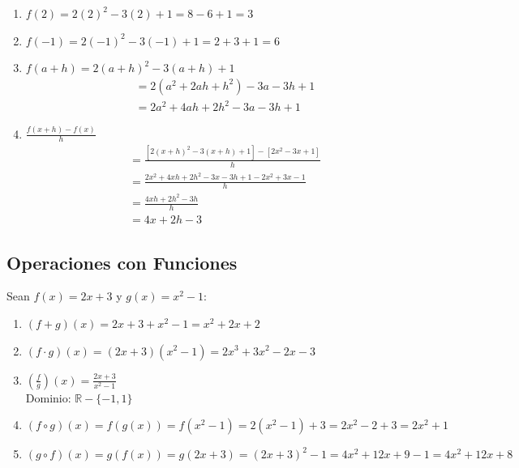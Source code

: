 \documentclass[12pt,a4paper]{article}
\begin{document}
\begin{enumerate}
    \item $f(2) = 2(2)^2 - 3(2) + 1 = 8 - 6 + 1 = 3$
    
    \item $f(-1) = 2(-1)^2 - 3(-1) + 1 = 2 + 3 + 1 = 6$
    
    \item $f(a + h) = 2(a + h)^2 - 3(a + h) + 1$
    \begin{align*}
        &= 2(a^2 + 2ah + h^2) - 3a - 3h + 1\\
        &= 2a^2 + 4ah + 2h^2 - 3a - 3h + 1
    \end{align*}
    
    \item $\frac{f(x + h) - f(x)}{h}$
    \begin{align*}
        &= \frac{[2(x + h)^2 - 3(x + h) + 1] - [2x^2 - 3x + 1]}{h}\\
        &= \frac{2x^2 + 4xh + 2h^2 - 3x - 3h + 1 - 2x^2 + 3x - 1}{h}\\
        &= \frac{4xh + 2h^2 - 3h}{h}\\
        &= 4x + 2h - 3
    \end{align*}
\end{enumerate}

\subsection{Operaciones con Funciones}

Sean $f(x) = 2x + 3$ y $g(x) = x^2 - 1$:

\begin{enumerate}
    \item $(f + g)(x) = 2x + 3 + x^2 - 1 = x^2 + 2x + 2$
    
    \item $(f \cdot g)(x) = (2x + 3)(x^2 - 1) = 2x^3 + 3x^2 - 2x - 3$
    
    \item $\left(\frac{f}{g}\right)(x) = \frac{2x + 3}{x^2 - 1}$\\
    Dominio: $\mathbb{R} - \{-1, 1\}$
    
    \item $(f \circ g)(x) = f(g(x)) = f(x^2 - 1) = 2(x^2 - 1) + 3 = 2x^2 - 2 + 3 = 2x^2 + 1$
    
    \item $(g \circ f)(x) = g(f(x)) = g(2x + 3) = (2x + 3)^2 - 1 = 4x^2 + 12x + 9 - 1 = 4x^2 + 12x + 8$
\end{enumerate}
\end{document}
